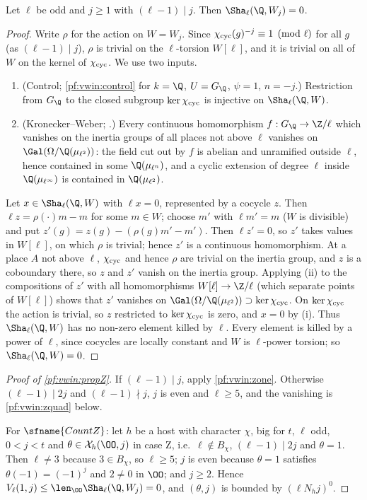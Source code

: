 \begin{lemma}\label{pf:vwin:zone}
Let $\ell$ be odd and $j\ge1$ with $(\ell-1)\mid j$. Then $\Sha_\ell(\Q,W_j)=0$.
\end{lemma}

\begin{proof}
Write $\rho$ for the action on $W=W_j$. Since $\chi_{\mathrm{cyc}}(g)^{-j}\equiv1\pmod\ell$ for all $g$ (as $(\ell-1)\mid j$), $\rho$ is trivial on
the $\ell$-torsion $W[\ell]$, and it is trivial on all of $W$ on the kernel of $\chi_{\mathrm{cyc}}$. We use two inputs.
\begin{enumerate}[label=(\roman*)]
\item (Control; \cref{pf:vwin:control} for $k=\Q$, $U=G_\Q$, $\psi=1$, $n=-j$.) Restriction from $G_\Q$ to the closed subgroup
$\ker\chi_{\mathrm{cyc}}$ is injective on $\Sha_\ell(\Q,W)$.
\item (Kronecker--Weber; .) Every continuous homomorphism $f:G_\Q\to\Z/\ell$ which vanishes on the inertia
groups of all places not above $\ell$ vanishes on $\Gal(\Omega/\Q(\mu_{\ell^2}))$: the field cut out by $f$ is abelian and unramified
outside $\ell$, hence contained in some $\Q(\mu_{\ell^{n}})$, and a cyclic extension of degree $\ell$ inside $\Q(\mu_{\ell^\infty})$ is
contained in $\Q(\mu_{\ell^2})$.
\end{enumerate}
Let $x\in\Sha_\ell(\Q,W)$ with $\ell x=0$, represented by a cocycle $z$. Then $\ell z=\rho(\cdot)m-m$ for some $m\in W$; choose $m'$ with
$\ell m'=m$ ($W$ is divisible) and put $z'(g)=z(g)-(\rho(g)m'-m')$. Then $\ell z'=0$, so $z'$ takes values in $W[\ell]$, on which $\rho$
is trivial; hence $z'$ is a continuous homomorphism. At a place $A$ not above $\ell$, $\chi_{\mathrm{cyc}}$ and hence $\rho$ are trivial on the
inertia group, and $z$ is a coboundary there, so $z$ and $z'$ vanish on the inertia group. Applying (ii) to the compositions of $z'$
with all homomorphisms $W[\ell]\to\Z/\ell$ (which separate points of $W[\ell]$) shows that $z'$ vanishes on
$\Gal(\Omega/\Q(\mu_{\ell^2}))\supset\ker\vwincyc$. On $\ker\chi_{\mathrm{cyc}}$ the action is trivial, so $z$ restricted to $\ker\chi_{\mathrm{cyc}}$ is zero,
and $x=0$ by (i). Thus $\Sha_\ell(\Q,W)$ has no non-zero element killed by $\ell$. Every element is killed by a power of $\ell$, since
cocycles are locally constant and $W$ is $\ell$-power torsion; so $\Sha_\ell(\Q,W)=0$.
\end{proof}

\begin{proof}[Proof of \cref{pf:vwin:propZ}]
If $(\ell-1)\mid j$, apply \cref{pf:vwin:zone}. Otherwise $(\ell-1)\mid2j$ and $(\ell-1)\nmid j$, $j$ is even and $\ell\ge5$, and the
vanishing is \cref{pf:vwin:zquad} below.

For $\sfname{CountZ}$: let $h$ be a host with character $\chi$, big for $t$, $\ell$ odd, $0<j<t$ and $\theta\in\vwinX_h(\OO,j)$ in case Z,
i.e.\ $\ell\notin B_\chi$, $(\ell-1)\mid2j$ and $\theta=1$. Then $\ell\ne3$ because $3\in B_\chi$, so $\ell\ge5$; $j$ is even because
$\theta=1$ satisfies $\theta(-1)=(-1)^j$ and $2\ne0$ in $\OO$; and $j\ge2$. Hence $V_\ell(1,j)\le\len_\OO\Sha_\ell(\Q,W_j)=0$, and $(\theta,j)$
is bounded by $(\ell N_hj)^0$.
\end{proof}

